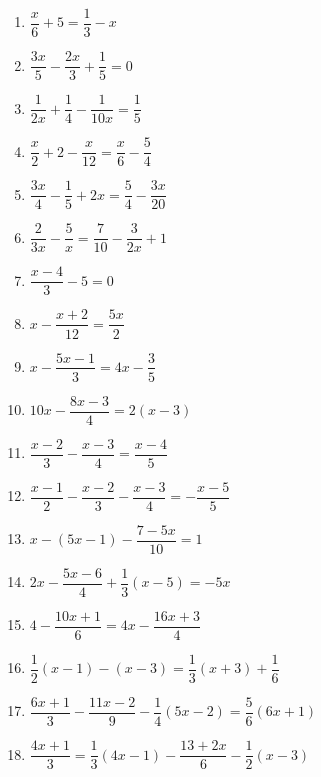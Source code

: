 \documentclass{article}
\begin{document}
\begin{enumerate}[label=\bfseries\small 141.\arabic*, itemsep=4cm]
\large

\item $\dfrac{x}{6} + 5 = \dfrac{1}{3} - x$

\item $\dfrac{3x}{5} - \dfrac{2x}{3} + \dfrac{1}{5} = 0$

\item $\dfrac{1}{2x} + \dfrac{1}{4} - \dfrac{1}{10x} = \dfrac{1}{5}$

\item $\dfrac{x}{2} + 2 - \dfrac{x}{12} = \dfrac{x}{6} - \dfrac{5}{4}$

\item $\dfrac{3x}{4} - \dfrac{1}{5} + 2x = \dfrac{5}{4} - \dfrac{3x}{20}$

\item $\dfrac{2}{3x} - \dfrac{5}{x} = \dfrac{7}{10} - \dfrac{3}{2x} + 1$

\item $\dfrac{x-4}{3} - 5 = 0$

\item $x - \dfrac{x+2}{12} = \dfrac{5x}{2}$

\item $x - \dfrac{5x-1}{3} = 4x - \dfrac{3}{5}$

\item $10x - \dfrac{8x-3}{4} = 2(x-3)$

\item $\dfrac{x-2}{3} - \dfrac{x-3}{4} = \dfrac{x-4}{5}$

\item $\dfrac{x-1}{2} - \dfrac{x-2}{3} - \dfrac{x-3}{4} = -\dfrac{x-5}{5}$

\item $x - (5x-1) - \dfrac{7-5x}{10} = 1$

\item $2x - \dfrac{5x-6}{4} + \dfrac{1}{3}(x-5) = -5x$

\item $4 - \dfrac{10x+1}{6} = 4x - \dfrac{16x+3}{4}$

\item $\dfrac{1}{2}(x-1) - (x-3) = \dfrac{1}{3}(x+3) + \dfrac{1}{6}$

\item $\dfrac{6x+1}{3} - \dfrac{11x-2}{9} - \dfrac{1}{4}(5x-2) = \dfrac{5}{6}(6x+1)$

\item $\dfrac{4x+1}{3} = \dfrac{1}{3}(4x-1) - \dfrac{13+2x}{6} - \dfrac{1}{2}(x-3)$


\end{enumerate}
\end{document}
